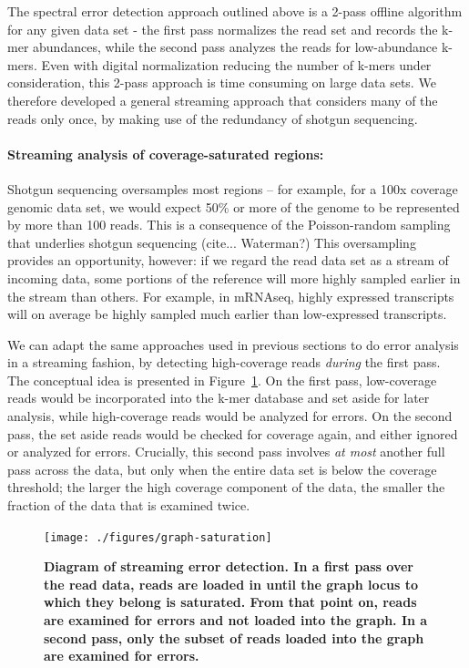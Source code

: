 \documentclass{article}
\begin{document}
The spectral error detection approach outlined above is a 2-pass
offline algorithm for any given data set - the first pass normalizes
the read set and records the k-mer abundances, while the second pass
analyzes the reads for low-abundance k-mers.  Even with digital
normalization reducing the number of k-mers under consideration, this
2-pass approach is time consuming on large data sets.  We therefore
developed a general streaming approach that considers many of the
reads only once, by making use of the redundancy of shotgun
sequencing.

\paragraph{Streaming analysis of coverage-saturated regions:}

Shotgun sequencing oversamples most regions --
for example, for a 100x coverage genomic data set, we would expect
50\% or more of the genome to be represented by more than 100 reads.
This is a consequence of the Poisson-random sampling that underlies
shotgun sequencing (cite... Waterman?)  This oversampling provides an
opportunity, however: if we regard the read data set as a stream of
incoming data, some portions of the reference will more highly sampled
earlier in the stream than others.  For example, in mRNAseq, highly
expressed transcripts will on average be highly sampled much earlier
than low-expressed transcripts.

We can adapt the same approaches used in previous sections to do error
analysis in a streaming fashion, by detecting high-coverage reads {\em
  during} the first pass.  The conceptual idea is presented in
Figure~\ref{fig:concept}.  On the first pass, low-coverage reads would
be incorporated into the k-mer database and set aside for later
analysis, while high-coverage reads would be analyzed for errors. On
the second pass, the set aside reads would be checked for coverage
again, and either ignored or analyzed for errors.  Crucially, this
second pass involves {\em at most} another full pass across the data,
but only when the entire data set is below the coverage threshold; the
larger the high coverage component of the data, the smaller the
fraction of the data that is examined twice.

\begin{figure}[!ht]
 \centerline{\texttt{[image: ./figures/graph-saturation]}}
\caption{\bf Diagram of streaming error detection. In a first pass
over the read data, reads are loaded in until the graph locus to which
they belong is saturated.  From that point on, reads are examined for
errors and not loaded into the graph.  In a second pass, only the subset
of reads loaded into the graph are examined for errors.}
\label{fig:concept}
\end{figure}
\end{document}
